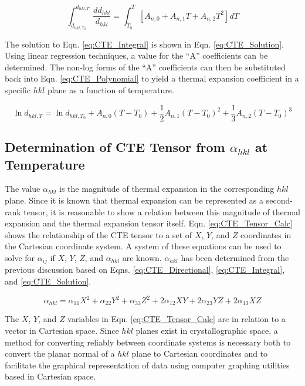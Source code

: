 \begin{equation}
 \int_{d_{hkl,T_0}}^{d_{hkl,T}} \frac{dd_{hkl}}{d_{hkl}} = \int_{T_0}^T \left[ A_{n,0} + A_{n,1}T + A_{n,2}T^2\right]dT
 \label{eq:CTE_Integral}
\end{equation}

The solution to Eqn. \ref{eq:CTE_Integral} is shown in Eqn. \ref{eq:CTE_Solution}.  Using linear regression techniques, a value for the ``A'' coefficients can be determined.  The non-log forms of the ``A'' coefficients can then be substituted back into Eqn. \ref{eq:CTE_Polynomial} to yield a thermal expansion coefficient in a specific $hkl$ plane as a function of temperature.

\begin{equation}
 \ln d_{hkl,T} = \ln d_{hkl,T_0} + A_{n,0}\left(T-T_0\right) + \frac{1}{2} A_{n,1} \left(T-T_0\right)^2 + \frac{1}{3} A_{n,2}\left(T-T_0\right)^3
 \label{eq:CTE_Solution}
\end{equation}

\subsection{Determination of CTE Tensor from $\alpha_{hkl}$ at Temperature}

The value $\alpha_{hkl}$ is the magnitude of thermal expansion in the corresponding $hkl$ plane.  Since it is known that thermal expansion can be represented as a second-rank tensor, it is reasonable to show a relation between this magnitude of thermal expansion and the thermal expansion tensor itself.  Eqn. \ref{eq:CTE_Tensor_Calc} shows the relationship of the CTE tensor to a set of $X$, $Y$, and $Z$ coordinates in the Cartesian coordinate system.  A system of these equations can be used to solve for $\alpha_{ij}$ if $X$, $Y$, $Z$, and $\alpha_{hkl}$ are known.  $\alpha_{hkl}$ has been determined from the previous discussion based on Eqns. \ref{eq:CTE_Directional}, \ref{eq:CTE_Integral}, and \ref{eq:CTE_Solution}.

\begin{equation}
 \alpha_{hkl} = \alpha_{11} X^2 + \alpha_{22} Y^2 + \alpha_{33} Z^2 + 2\alpha_{12} XY + 2\alpha_{23} YZ + 2\alpha_{13} XZ
 \label{eq:CTE_Tensor_Calc}
\end{equation}

The $X$, $Y$, and $Z$ variables in Eqn. \ref{eq:CTE_Tensor_Calc} are in relation to a vector in Cartesian space.  Since $hkl$ planes exist in crystallographic space, a method for converting reliably between coordinate systems is necessary both to convert the planar normal of a $hkl$ plane to Cartesian coordinates and to facilitate the graphical representation of data using computer graphing utilities based in Cartesian space.

